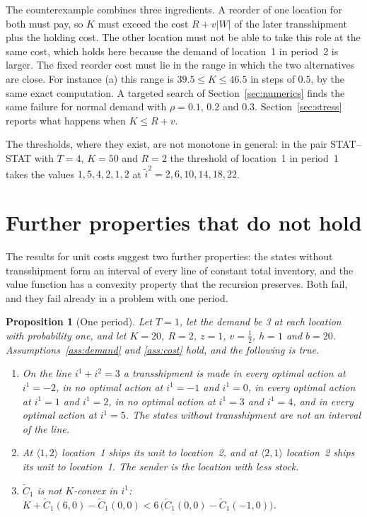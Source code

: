 \documentclass[11pt]{article}
\newcommand{\Ct}{\widetilde{C}}
\newtheorem{proposition}{Proposition}
\theoremstyle{definition}
\begin{document}
The counterexample combines three ingredients. A reorder of one location for both must pay, so $K$ must exceed the cost $R+v|W|$ of the later transshipment plus the holding cost. The other location must not be able to take this role at the same cost, which holds here because the demand of location~1 in period~2 is larger. The fixed reorder cost must lie in the range in which the two alternatives are close. For instance (a) this range is $39.5\le K\le46.5$ in steps of $0.5$, by the same exact computation. A targeted search of Section~\ref{sec:numerics} finds the same failure for normal demand with $\rho=0.1$, $0.2$ and $0.3$. Section~\ref{sec:stress} reports what happens when $K\le R+v$.

The thresholds, where they exist, are not monotone in general: in the pair STAT--STAT with $T=4$, $K=50$ and $R=2$ the threshold of location~1 in period~1 takes the values $1,5,4,2,1,2$ at $\tilde{i}^2=2,6,10,14,18,22$.

\section{Further properties that do not hold}\label{sec:false}

The results for unit costs suggest two further properties: the states without transshipment form an interval of every line of constant total inventory, and the value function has a convexity property that the recursion preserves. Both fail, and they fail already in a problem with one period.

\begin{proposition}[One period]\label{prop:oneperiod}
Let $T=1$, let the demand be 3 at each location with probability one, and let $K=20$, $R=2$, $z=1$, $v=\tfrac12$, $h=1$ and $b=20$. Assumptions~\ref{ass:demand} and \ref{ass:cost} hold, and the following is true.
\begin{enumerate}[label=(\roman*)]
\item On the line $i^1+i^2=3$ a transshipment is made in every optimal action at $i^1=-2$, in no optimal action at $i^1=-1$ and $i^1=0$, in every optimal action at $i^1=1$ and $i^1=2$, in no optimal action at $i^1=3$ and $i^1=4$, and in every optimal action at $i^1=5$. The states without transshipment are not an interval of the line.
\item At $\langle1,2\rangle$ location~1 ships its unit to location~2, and at $\langle2,1\rangle$ location~2 ships its unit to location~1. The sender is the location with less stock.
\item $\Ct_1$ is not $K$-convex in $i^1$: $K+\Ct_1(6,0)-\Ct_1(0,0)<6\,\big(\Ct_1(0,0)-\Ct_1(-1,0)\big)$.
\end{enumerate}
\end{proposition}
\end{document}
